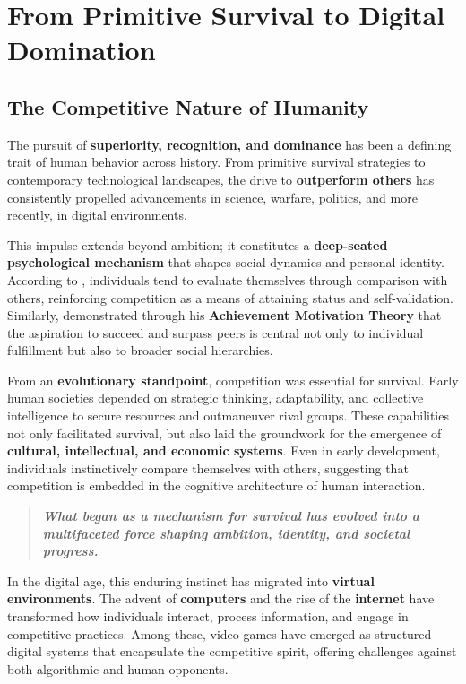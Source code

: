 \chapter{From Primitive Survival to Digital Domination}

\section{The Competitive Nature of Humanity}

The pursuit of \textbf{superiority, recognition, and dominance} has been a defining trait of human behavior across history. From primitive survival strategies to contemporary technological landscapes, the drive to \textbf{outperform others} has consistently propelled advancements in science, warfare, politics, and more recently, in digital environments.

This impulse extends beyond ambition; it constitutes a \textbf{deep-seated psychological mechanism} that shapes social dynamics and personal identity. According to \textcite{festinger1954theory}, individuals tend to evaluate themselves through comparison with others, reinforcing competition as a means of attaining status and self-validation. Similarly, \textcite{mcclelland1961achievement} demonstrated through his \textbf{Achievement Motivation Theory} that the aspiration to succeed and surpass peers is central not only to individual fulfillment but also to broader social hierarchies.

From an \textbf{evolutionary standpoint}, competition was essential for survival. Early human societies depended on strategic thinking, adaptability, and collective intelligence to secure resources and outmaneuver rival groups. These capabilities not only facilitated survival, but also laid the groundwork for the emergence of \textbf{cultural, intellectual, and economic systems}. Even in early development, individuals instinctively compare themselves with others, suggesting that competition is embedded in the cognitive architecture of human interaction.

\begin{quote}
\textbf{\textit{What began as a mechanism for survival has evolved into a multifaceted force shaping ambition, identity, and societal progress.}}
\end{quote}

In the digital age, this enduring instinct has migrated into \textbf{virtual environments}. The advent of \textbf{computers} and the rise of the \textbf{internet} have transformed how individuals interact, process information, and engage in competitive practices. Among these, video games have emerged as structured digital systems that encapsulate the competitive spirit, offering challenges against both algorithmic and human opponents.

